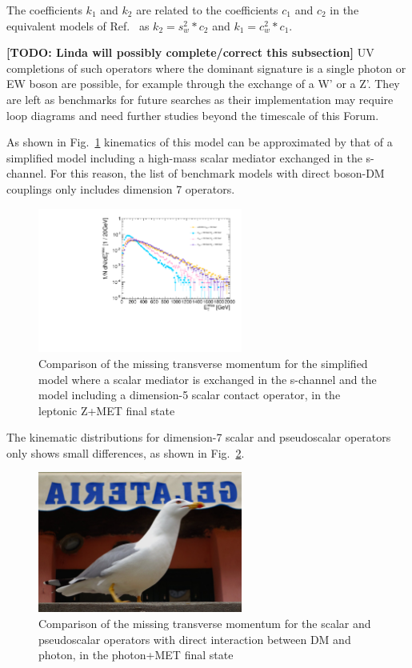 The coefficients $k_1$ and $k_2$ are related to the coefficients $c_1$ and $c_2$ 
in the equivalent models of Ref.~\cite{Crivellin:2015wva} as $k_2 = s_w^2*c_2$ and $k_1=c_w^2 *c_1$.

\textbf{[TODO: Linda will possibly complete/correct this subsection]} UV completions of 
such operators where the dominant signature is a single photon or EW boson are possible, 
for example through the exchange of a W' or a Z'. They are left as benchmarks for future searches as 
their implementation may require loop diagrams and need further studies beyond the timescale of this Forum. 

As shown in Fig.~\ref{fig:EW_EFT5_Zlep_MET}
kinematics of this model can be approximated by that of a simplified model including 
a high-mass scalar mediator exchanged in the s-channel. For this reason, 
the list of benchmark models with direct boson-DM couplings only includes dimension 7 operators. 

\begin{figure}
    \includegraphics[width=0.6\textwidth]{figures/EW/pt_vv2_xxDHDH_vs_ScalarMediator.pdf}
    \caption{Comparison of the missing transverse momentum for the simplified model
    where a scalar mediator is exchanged in the s-channel and the model including 
    a dimension-5 scalar contact operator, in the leptonic Z+MET final state}
    \label{fig:EW_EFT5_Zlep_MET}
\end{figure}

The kinematic distributions for dimension-7 scalar and pseudoscalar operators 
only shows small differences, as shown in Fig.~\ref{fig:EW_EFT5_gamma_MET}. 

\begin{figure}
    \includegraphics[width=0.6\textwidth]{figures/llug}
    \caption{Comparison of the missing transverse momentum for the scalar and pseudoscalar
    operators with direct interaction between DM and photon, in the photon+MET final state}
    \label{fig:EW_EFT5_gamma_MET}
\end{figure}


